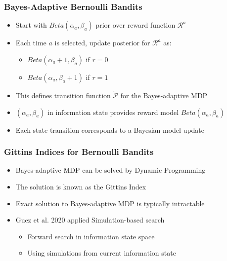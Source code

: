 \documentclass[handout]{beamer}
\begin{document}
\begin{frame}
\frametitle{Bayes-Adaptive Bernoulli Bandits}
\pause
\begin{itemize}[<+->]
\item Start with $Beta(\alpha_a, \beta_a)$ prior over reward function $\mathcal{R}^a$
\item Each time $a$ is selected, update posterior for $\mathcal{R}^a$ as:
\begin{itemize}
\item $Beta(\alpha_a+1, \beta_a)$ if $r=0$
\item $Beta(\alpha_a, \beta_a+1)$ if $r=1$
\end{itemize}
\item This defines transition function $\tilde{\mathcal{P}}$ for the Bayes-adaptive MDP
\item $(\alpha_a, \beta_a)$ in information state provides reward model $Beta(\alpha_a, \beta_a)$
\item Each state transition corresponds to a Bayesian model update
\end{itemize}
\end{frame}

\begin{frame}
\frametitle{Gittins Indices for Bernoulli Bandits}
\pause
\begin{itemize}[<+->]
\item Bayes-adaptive MDP can be solved by Dynamic Programming
\item The solution is known as the Gittins Index
\item Exact solution to Bayes-adaptive MDP is typically intractable
\item Guez et al. 2020 applied Simulation-based search
\begin{itemize}
\item Forward search in information state space
\item Using simulations from current information state
\end{itemize}
\end{itemize}
\end{frame}
\end{document}
